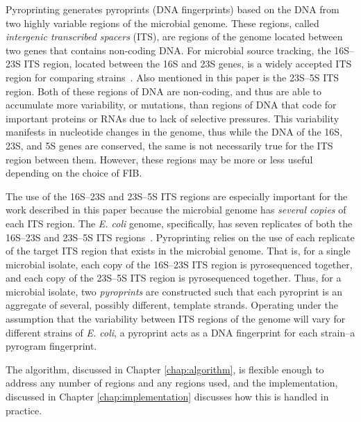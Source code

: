 \documentclass[12pt]{ucthesis}
\begin{document}
      Pyroprinting generates pyroprints (DNA fingerprints) based on the DNA
      from two highly variable regions of the microbial genome. These regions,
      called \textit{intergenic transcribed spacers} (ITS), are regions of the
      genome located between two genes that contains non-coding DNA. For
      microbial source tracking, the 16S--23S ITS region, located between the
      16S and 23S genes, is a widely accepted ITS region for comparing
      strains~\cite{Boyer:ITS, Roth:Phylo, Tyler:Primers}. Also mentioned in
      this paper is the 23S--5S ITS region. Both of these regions of DNA are
      non-coding, and thus are able to accumulate more variability, or
      mutations, than regions of DNA that code for important proteins or RNAs
      due to lack of selective pressures. This variability manifests in
      nucleotide changes in the genome, thus while the DNA of the 16S, 23S, and
      5S genes are conserved, the same is not necessarily true for the ITS
      region between them. However, these regions may be more or less useful
      depending on the choice of FIB.
      
      The use of the 16S--23S and 23S--5S ITS regions are especially important
      for the work described in this paper because the microbial genome has
      \textit{several copies} of each ITS region. The \textit{E. coli} genome,
      specifically, has seven replicates of both the 16S--23S and 23S--5S ITS
      regions~\cite{Boyer:ITS, Roth:Phylo, Tyler:Primers}. Pyroprinting relies
      on the use of each replicate of the target ITS region that exists in the
      microbial genome. That is, for a single microbial isolate, each copy of
      the 16S--23S ITS region is pyrosequenced together, and each copy of the
      23S--5S ITS region is pyrosequenced together. Thus, for a microbial
      isolate, two \textit{pyroprints} are constructed such that each pyroprint is
      an aggregate of several, possibly different, template strands. Operating
      under the assumption that the variability between ITS regions of the
      genome will vary for different strains of \textit{E. coli}, a pyroprint
      acts as a DNA fingerprint for each strain--a pyrogram fingerprint.
      
      The algorithm, discussed in Chapter \ref{chap:algorithm}, is flexible
      enough to address any number of regions and any regions used, and the
      implementation, discussed in Chapter \ref{chap:implementation} discusses
      how this is handled in practice.
\end{document}
